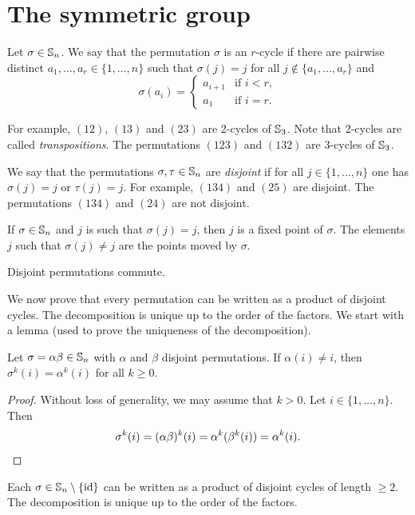 \section{The symmetric group}
\lecture\label{lec:symmetric}

Let $\sigma\in\mathbb{S}_n$. We say that the permutation $\sigma$ is an $r$-cycle 
if there are pairwise distinct $a_1,\dots,a_r\in\{1,\dots,n\}$ such that 
$\sigma(j)=j$ for all $j\not\in\{a_1,\dots,a_r\}$ and 
\[
\sigma(a_i)=\begin{cases}
a_{i+1} & \text{if $i<r$},\\
a_1 & \text{if $i=r$}.
\end{cases}
\]

For example, $(12)$, $(13)$ and $(23)$ are 2-cycles of 
$\mathbb{S}_3$. Note that 
2-cycles are called \emph{transpositions}.
The permutations $(123)$ and $(132)$ are 3-cycles of $\mathbb{S}_3$.

We say that the permutations $\sigma,\tau\in\mathbb{S}_n$ 
are \emph{disjoint} if for all 
$j\in\{1,\dots,n\}$
one has $\sigma(j)=j$ or $\tau(j)=j$. For example, 
$(134)$ and $(25)$ are disjoint. The permutations $(134)$ and 
$(24)$ are not disjoint. 

If $\sigma\in\mathbb{S}_n$ and $j$ is such that 
$\sigma(j)=j$, then $j$ is a fixed point of $\sigma$. The elements 
$j$ such that 
$\sigma(j)\ne j$ are the points moved by 
$\sigma$.

\begin{claim}
Disjoint permutations commute. 
\end{claim}


We now prove that every permutation can be written 
as a product of disjoint cycles. 
The decomposition is unique up to the order of the factors. 
We start with a lemma (used to prove the uniqueness of the decomposition).

\begin{lemma}
        Let $\sigma=\alpha\beta\in\mathbb{S}_n$ with $\alpha$ and $\beta$ disjoint permutations. If $\alpha(
i)\ne i$, then $\sigma^k(i)=\alpha^k(i)$ for all $k\geq0$.
\end{lemma}

\begin{proof}
    Without loss of generality, we may assume that $k>0$. 
    Let $i\in\{1,\dots,n\}$. Then \[
    \sigma^k(i)=(\alpha\beta)^k(i)=\alpha^k(\beta^k(i))=\alpha^k(i).\qedhere
    \]
\end{proof}

\begin{theorem}
Each $\sigma\in\mathbb{S}_n\setminus\{\operatorname{id}\}$ can be written as a product
of disjoint cycles of length 
 $\geq2$. The decomposition is unique up to 
 the order of the factors. 
 \end{theorem}

